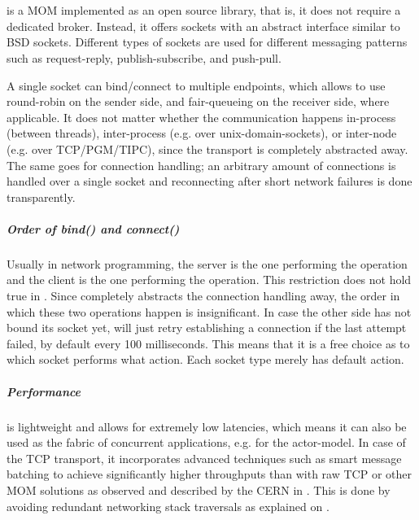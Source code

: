 \chapter{\zmq}\label{ch:zmq}
\zmq is a \gls{MOM} implemented as an open source library, that is, it does not
require a dedicated broker. Instead, it offers sockets with an abstract
interface similar to \acrshort{BSD} sockets. Different types of sockets are used for
different messaging patterns such as request-reply, publish-subscribe, and
push-pull.

A single socket can bind/connect to multiple endpoints, which allows \zmq to
use round-robin on the sender side, and fair-queueing on the receiver side,
where applicable. It does not matter whether the communication happens
in-process (between threads), inter-process (e.g. over \glspl{unix-domain-socket}), or
inter-node (e.g. over \acrshort{TCP}/\acrshort{PGM}/\acrshort{TIPC}), since the transport is completely
abstracted away. The same goes for connection handling; an arbitrary amount of
connections is handled over a single socket and reconnecting after short
network failures is done transparently.

\paragraph{Order of bind() and connect()}
Usually in network programming, the server is the one performing the
 operation and the client is the one performing the 
operation. This restriction does not hold true in \zmq. Since \zmq completely
abstracts the connection handling away, the order in which these two operations
happen is insignificant. In case the other side has not bound its socket
yet, \zmq will just retry establishing a connection if the last attempt failed,
by default every 100 milliseconds. This means that it is a free choice as to which socket
performs what action. Each socket type merely has default action.


\paragraph{Performance} \zmq is lightweight and allows for extremely low latencies, which means it can
also be used as the fabric of concurrent applications, e.g. for the \gls{actor-model}.
In case of the TCP transport, it incorporates advanced techniques such
as smart message batching to achieve significantly higher throughputs than with
raw TCP or other \gls{MOM} solutions as observed and described by the CERN in
\cite[Figure 2, Middleware evaluation and prototyping, p.~4]{cern:new-cmw}.
This is done by avoiding redundant networking stack traversals as explained on
\cite[Performance]{zmq:faq}.

